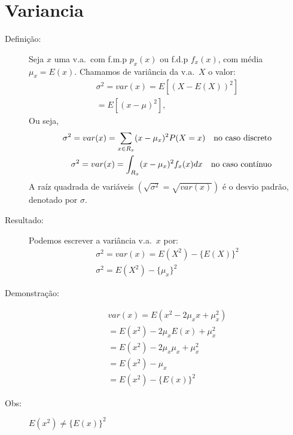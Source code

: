  \section{Variancia}

 \begin{description}
   \item [Definição:] Seja $x$ uma v.a.\ com f.m.p $p_{x}(x)$ ou f.d.p $f_{x}(x)$, com 
     média $\mu_{x}=E(x)$. Chamamos de variância da v.a.\ $X$ o valor: 
     \begin{align}
       \sigma^2=var(x)=E[(X-E(X))^2]\\
       =E[(x-\mu)^2],
     \end{align}
     Ou seja,
     \begin{align}
       \sigma^2 =var(x)=\sum_{x \in R_{x}} (x-\mu_{x})^2 P(X=x) \text{\quad no caso discreto}\\
       \sigma^2 =var(x)=\int_{R_{x}} (x-\mu_{x})^2 f_{x}(x)dx \text{\quad no caso contínuo}
     \end{align}
     A raíz quadrada de variáveis $(\sqrt{\sigma^2}=\sqrt{var(x)})$ é o desvio padrão, 
     denotado por $\sigma$.
   \item [Resultado:] Podemos escrever a variância v.a.\ $x$ por: 
     \begin{align}
       \sigma^2 =var(x)=E(X^2)-\{E(X)\}^2\\
       \sigma^2 =E(X^2)-\{\mu_x\}^2
     \end{align}
   \item [Demonstração:] 
     \begin{align}
       var(x)=E(x^2-2\mu_{x}x+\mu_{x}^2)\\
       =E(x^2)-2\mu_{x}E(x)+\mu_{x}^2\\
       =E(x^2)-2\mu_{x}\mu_{x}+\mu_{x}^2\\
       =E(x^2)-\mu_{x}\\
       =E(x^2)-\{E(x)\}^2
     \end{align}
   \item [Obs:] $E(x^2) \neq \{E(x)\}^2$


\end{description}
